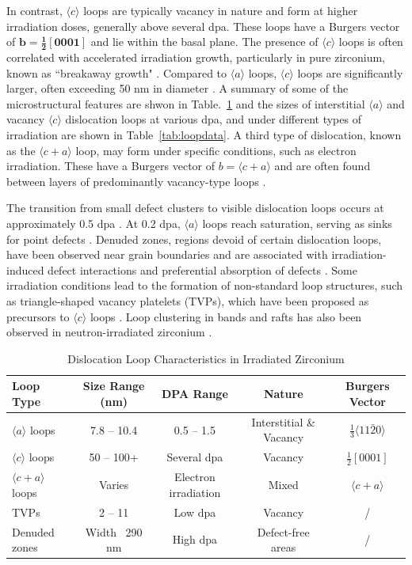 \documentclass[12pt]{article}
\begin{document}
In contrast, $\langle c \rangle$ loops are typically vacancy in nature and form at higher irradiation doses, generally above several dpa. These loops have a Burgers vector of $\mathbf{b = \frac{1}{2} [0001]}$ and lie within the basal plane. The presence of $\langle c \rangle$ loops is often correlated with accelerated irradiation growth, particularly in pure zirconium, known as ``breakaway growth" \cite{griffiths1988review}. Compared to $\langle a \rangle$ loops, $\langle c \rangle$ loops are significantly larger, often exceeding 50 nm in diameter \cite{long2024electron}. A summary of some of the microstructural features are shwon in Table.~\ref{tab:loop_characteristics} and the sizes of interstitial $\langle a\rangle$ and vacancy $\langle c\rangle$ dislocation loops at various dpa, and under different types of irradiation are shown in Table~\ref{tab:loopdata}. A third type of dislocation, known as the $\langle c+a \rangle$ loop, may form under specific conditions, such as electron irradiation. These have a Burgers vector of $b = \langle c+a \rangle$ and are often found between layers of predominantly vacancy-type loops \cite{griffiths1988review}.

The transition from small defect clusters to visible dislocation loops occurs at approximately 0.5 dpa \cite{li2024abnormal}. At 0.2 dpa, $\langle a \rangle$ loops reach saturation, serving as sinks for point defects \cite{liu2021transmission}. Denuded zones, regions devoid of certain dislocation loops, have been observed near grain boundaries and are associated with irradiation-induced defect interactions and preferential absorption of defects \cite{long2024electron}. Some irradiation conditions lead to the formation of non-standard loop structures, such as triangle-shaped vacancy platelets (TVPs), which have been proposed as precursors to $\langle c \rangle$ loops \cite{liu2020two}. Loop clustering in bands and rafts has also been observed in neutron-irradiated zirconium \cite{griffiths1988review}.

\begin{table}[h]
    \centering
    \caption{Dislocation Loop Characteristics in Irradiated Zirconium}
    \begin{tabular}{lcccc}
        \toprule
        Loop Type & Size Range (nm) & DPA Range & Nature & Burgers Vector \\
        \midrule
        $\langle a \rangle$ loops & 7.8 – 10.4 & 0.5 – 1.5 & Interstitial \& Vacancy & $\frac{1}{3} \langle 11\bar{2}0 \rangle$ \\
        $\langle c \rangle$ loops & 50 – 100+ & Several dpa & Vacancy & $\frac{1}{2} [0001]$ \\
        $\langle c+a \rangle$ loops & Varies & Electron irradiation & Mixed & $\langle c+a \rangle$ \\
        TVPs & 2 – 11 & Low dpa & Vacancy & / \\
        Denuded zones & Width ~290 nm & High dpa & Defect-free areas & / \\
        \bottomrule
    \end{tabular}
    \label{tab:loop_characteristics}
\end{table}
\end{document}
